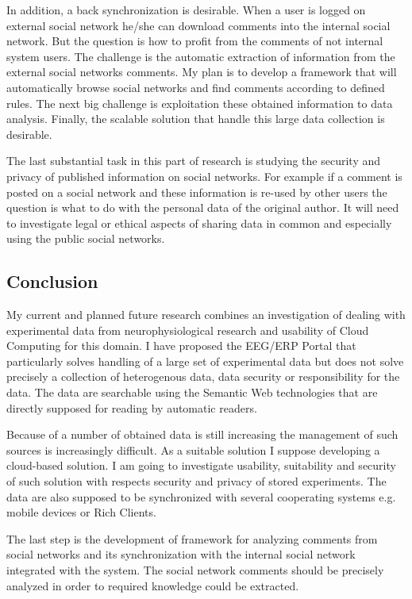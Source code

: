 \documentclass[a4paper, 10pt]{article}
\begin{document}
In addition, a back synchronization is desirable. When a user is logged on external social network he/she can download comments into the internal social network. But the question is how to profit from the comments of not internal system users. The challenge is the automatic extraction of information from the external social networks comments. My plan is to develop a framework that will automatically browse social networks and find comments according to defined rules. The next big challenge is exploitation these obtained information to data analysis. Finally, the scalable solution that handle this large data collection is desirable.

The last substantial task in this part of research is studying the security and privacy of published information on social networks. For example if a comment is posted on a social network and these information is re-used by other users the question is what to do with the personal data of the original author. It will need to investigate legal or ethical aspects of sharing data in common and especially using the public social networks.

\subsection*{Conclusion}

My current and planned future research combines an investigation of dealing with experimental data from neurophysiological research and usability of Cloud Computing for this domain. I have proposed the EEG/ERP Portal that particularly solves handling of a large set of experimental data but does not solve precisely a collection of heterogenous data, data security or responsibility for the data. The data are searchable using the Semantic Web technologies that are directly supposed for reading by automatic readers.

Because of a number of obtained data is still increasing the management of such sources is increasingly difficult. As a suitable solution I suppose developing a cloud-based solution. I am going to investigate usability, suitability and security of such solution with respects security and privacy of stored experiments. The data are also supposed to be synchronized with several cooperating systems e.g. mobile devices or Rich Clients.

The last step is the development of framework for analyzing comments from social networks and its synchronization with the internal social network integrated with the system. The social network comments should be precisely analyzed in order to required knowledge could be extracted.
\end{document}
